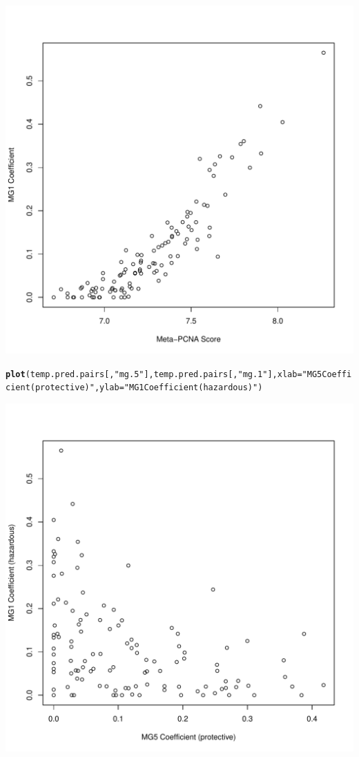 \documentclass{article}\usepackage[]{graphicx}\usepackage[]{color}
\makeatletter
\def\maxwidth{ %
  \ifdim\Gin@nat@width>\linewidth
    \linewidth
  \else
    \Gin@nat@width
  \fi
}
\newcommand{\hlstr}[1]{\textcolor[rgb]{0.192,0.494,0.8}{#1}}%
\newcommand{\hlstd}[1]{\textcolor[rgb]{0.345,0.345,0.345}{#1}}%
\newcommand{\hlkwc}[1]{\textcolor[rgb]{0.333,0.667,0.333}{#1}}%
\newcommand{\hlkwd}[1]{\textcolor[rgb]{0.737,0.353,0.396}{\textbf{#1}}}%
\newenvironment{kframe}{%
 \def\at@end@of@kframe{}%
 \ifinner\ifhmode%
  \def\at@end@of@kframe{\end{minipage}}%
  \begin{minipage}{\columnwidth}%
 \fi\fi%
 \def\FrameCommand##1{\hskip\@totalleftmargin \hskip-\fboxsep
 \colorbox{shadecolor}{##1}\hskip-\fboxsep
     \hskip-\linewidth \hskip-\@totalleftmargin \hskip\columnwidth}%
 \MakeFramed {\advance\hsize-\width
   \@totalleftmargin\z@ \linewidth\hsize
   \@setminipage}}%
 {\par\unskip\endMakeFramed%
 \at@end@of@kframe}
\newenvironment{knitrout}{}{} %
\makeatother
\begin{document}
\begin{knitrout}
{\centering \includegraphics[width=\maxwidth]{figure/metagene-pairs-7} 

}


\begin{kframe}\begin{alltt}
\hlkwd{plot}\hlstd{(temp.pred.pairs[,}\hlstr{"mg.5"}\hlstd{], temp.pred.pairs[,}\hlstr{"mg.1"}\hlstd{],} \hlkwc{xlab} \hlstd{=} \hlstr{"MG5 Coefficient (protective)"}\hlstd{,} \hlkwc{ylab} \hlstd{=} \hlstr{"MG1 Coefficient (hazardous)"}\hlstd{)}
\end{alltt}
\end{kframe}

{\centering \includegraphics[width=\maxwidth]{figure/metagene-pairs-8} 

}
\end{knitrout}
\end{document}
